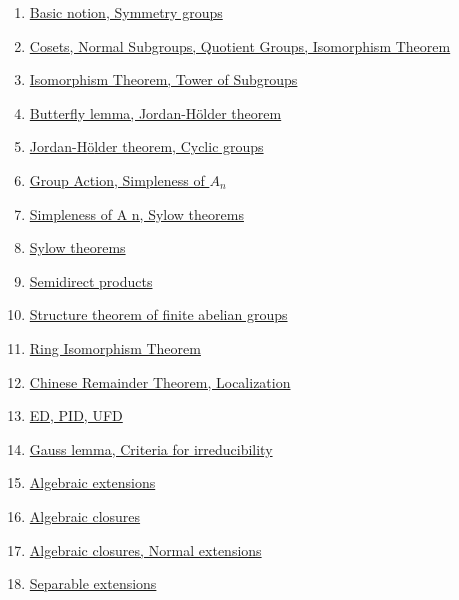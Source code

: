 \documentclass[11pt]{article}
\begin{document}
\begin{enumerate}
	\item	\href{https://mp.weixin.qq.com/s/U7iFVvBvINlfrHjUGhLCFw}{Basic notion, Symmetry groups}	%
	\item	\href{https://mp.weixin.qq.com/s/4YhJzO-ZhG1nsegyE4KYyg}{Cosets, Normal Subgroups, Quotient Groups, Isomorphism Theorem}	%
	\item	\href{https://mp.weixin.qq.com/s/3XHg-HW9TnPB6bRD36mcNA}{Isomorphism Theorem, Tower of Subgroups} 	%
	\item 	\href{https://mp.weixin.qq.com/s/eolu7bi9_oBitx85j_4qhA}{Butterfly lemma, Jordan-Hölder theorem}	%
	\item 	\href{https://mp.weixin.qq.com/s/aRlC1OSJv1JTIzwu0AcAnw}{Jordan-H{\"o}lder theorem, Cyclic groups}	%
	\item 	\href{https://mp.weixin.qq.com/s/QN9cTQjvAgZVTp0QLcAZ-g}{Group Action, Simpleness of $A_n$}	%
	\item 	\href{https://mp.weixin.qq.com/s/IyBy7z0xVk29DJKv9mvJSg}{Simpleness of A n, Sylow theorems}	%
	\item 	\href{https://mp.weixin.qq.com/s/SPPofXOe2Yv2HhbQAPJalA}{Sylow theorems}	%
	\item 	\href{https://mp.weixin.qq.com/s/Tqzxf9_Ya2ABxQ4isaDptA}{Semidirect products}	%
	\item 	\href{https://mp.weixin.qq.com/s/sG9vhLCzINXEDk4inY82yw}{Structure theorem of finite abelian groups}	%
	\item	\href{https://mp.weixin.qq.com/s/yaSI9FfYZ-zMtfgxP-S58A}{Ring Isomorphism Theorem}	%
	\item	\href{https://mp.weixin.qq.com/s/c1AQUopODevWvzkd0DAsuA}{Chinese Remainder Theorem, Localization}	%
	\item	\href{https://mp.weixin.qq.com/s/foGkua-dmOiEfLW6COslWQ}{ED, PID, UFD} 	%
	\item 	\href{https://mp.weixin.qq.com/s/EE-IClTUvcotx89pHBSTeA}{Gauss lemma, Criteria for irreducibility}	%
	\item 	\href{https://mp.weixin.qq.com/s/fxxp2gTjq-t4ihSbcvCilw}{Algebraic extensions}	%
	\item 	\href{https://mp.weixin.qq.com/s/X9-4fHu3hTZ_bUIuK_Qo9g}{Algebraic closures}	%
	\item 	\href{https://mp.weixin.qq.com/s/I463e9e6xAHjwjP6g8NE_Q}{Algebraic closures, Normal extensions}	%
	\item 	\href{https://mp.weixin.qq.com/s/xSR8SbE-JBx7ZDGoTfVI4Q}{Separable extensions}	%

\end{enumerate}
\end{document}
